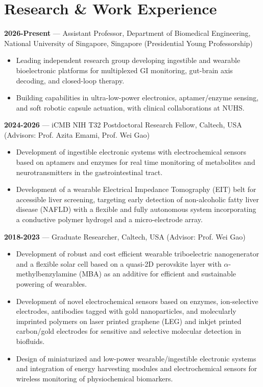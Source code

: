 \documentclass[11pt,a4paper]{article}
\begin{document}
\section{Research \& Work Experience}
\textbf{2026-Present} — Assistant Professor, Department of Biomedical Engineering, National University of Singapore, Singapore (Presidential Young Professorship)
\begin{itemize}[leftmargin=*, itemsep=2pt, parsep=0pt, topsep=2pt]
  \item Leading independent research group developing ingestible and wearable bioelectronic platforms for multiplexed GI monitoring, gut-brain axis decoding, and closed-loop therapy.
  \item Building capabilities in ultra-low-power electronics, aptamer/enzyme sensing, and soft robotic capsule actuation, with clinical collaborations at NUHS.
\end{itemize}
\textbf{2024-2026} — iCMB NIH T32 Postdoctoral Research Fellow, Caltech, USA (Advisors: Prof. Azita Emami, Prof. Wei Gao)
\begin{itemize}[leftmargin=*, itemsep=2pt, parsep=0pt, topsep=2pt]
  \item Development of ingestible electronic systems with electrochemical sensors based on aptamers and enzymes for real time monitoring of metabolites and neurotransmitters in the gastrointestinal tract.
  \item Development of a wearable Electrical Impedance Tomography (EIT) belt for accessible liver screening, targeting early detection of non-alcoholic fatty liver disease (NAFLD) with a flexible and fully autonomous system incorporating a conductive polymer hydrogel and a micro-electrode array.
\end{itemize}
\textbf{2018-2023} — Graduate Researcher, Caltech, USA (Advisor: Prof. Wei Gao)
\begin{itemize}[leftmargin=*, itemsep=2pt, parsep=0pt, topsep=2pt]
  \item Development of robust and cost efficient wearable triboelectric nanogenerator and a flexible solar cell based on a quasi-2D perovskite layer with $\alpha$-methylbenzylamine (MBA) as an additive for efficient and sustainable powering of wearables.
  \item Development of novel electrochemical sensors based on enzymes, ion-selective electrodes, antibodies tagged with gold nanoparticles, and molecularly imprinted polymers on laser printed graphene (LEG) and inkjet printed carbon/gold electrodes for sensitive and selective molecular detection in biofluids.
  \item Design of miniaturized and low-power wearable/ingestible electronic systems and integration of energy harvesting modules and electrochemical sensors for wireless monitoring of physiochemical biomarkers.
\end{itemize}
\end{document}
